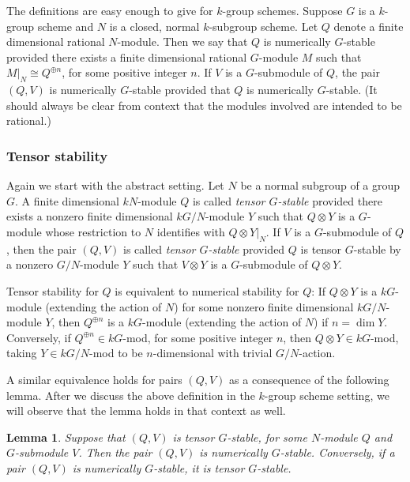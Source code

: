 \documentclass[11pt,leqno,amscd,amssymb,verbatim, url]{amsart}
\newtheorem{lem}[thm]{Lemma}
\theoremstyle{definition}
\numberwithin{equation}{thm}
\begin{document}

The definitions are easy enough to give for $k$-group schemes. Suppose $G$ is a $k$-group scheme and $N$ is a closed, normal $k$-subgroup scheme.
Let $Q$ denote a finite dimensional rational $N$-module. Then we say that $Q$ is numerically $G$-stable provided there exists a finite dimensional
 rational $G$-module $M$ such that $M|_N\cong Q^{\oplus n}$, for some positive integer $n$. If $V$ is a $G$-submodule of $Q$, the pair $(Q,V)$ is numerically $G$-stable
provided that $Q$ is numerically $G$-stable. (It should always be clear from context that the
 modules involved are intended to be rational.)

\subsubsection{Tensor stability}\label{tensor}  Again we start with the abstract setting. Let $N$ be a normal subgroup of a group $G$. A finite dimensional $kN$-module
$Q$ is called {\it tensor $G$-stable} provided there exists a nonzero finite dimensional $kG/N$-module $Y$ such that $Q\otimes Y$ is a $G$-module whose restriction
to $N$ identifies with $Q\otimes Y|_N$.
 If $V$ is a $G$-submodule of $Q$, then the pair $(Q,V)$ is called {\it tensor $G$-stable} provided
$Q$ is tensor $G$-stable by a nonzero $G/N$-module $Y$ such that $V\otimes Y$ is a $G$-submodule of $Q\otimes Y$.

Tensor stability for $Q$ is equivalent to numerical stability for $Q$: If $Q\otimes Y$ is a $kG$-module (extending the
 action of $N$) for some nonzero finite
dimensional  $kG/N$-module $Y$, then $Q^{\oplus n}$ is a $kG$-module (extending the action of $N$) if $n=\dim Y$. Conversely, if $Q^{\oplus n}\in kG$-mod,
for some positive integer $n$, then $Q\otimes Y\in kG$-mod, taking $Y\in kG/N$-mod to be $n$-dimensional with
trivial $G/N$-action.

A similar equivalence holds for pairs $(Q,V)$ as a consequence of the following lemma. After we discuss the
above definition in the $k$-group scheme setting, we will observe that the lemma holds in that context as well.

\begin{lem}\label{help} Suppose that $(Q,V)$ is tensor $G$-stable, for some $N$-module $Q$ and $G$-submodule $V$. Then the pair $(Q,V)$ is
numerically $G$-stable. Conversely, if a pair $(Q,V)$ is numerically $G$-stable, it is tensor $G$-stable.\end{lem}
\end{document}

